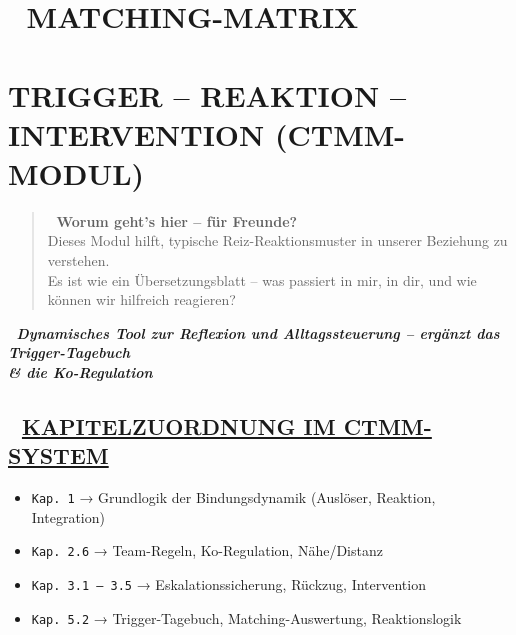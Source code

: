 \hypertarget{matching-matrix}{%
\section{\texorpdfstring{🧩 \textbf{MATCHING-MATRIX}}{🧩 MATCHING-MATRIX}}\label{matching-matrix}}

\hypertarget{trigger-reaktion-intervention-ctmm-modul}{%
\section{\texorpdfstring{\textbf{TRIGGER -- REAKTION -- INTERVENTION (CTMM-MODUL)}}{TRIGGER -- REAKTION -- INTERVENTION (CTMM-MODUL)}}\label{trigger-reaktion-intervention-ctmm-modul}}

\begin{quote}
🧠 \textbf{Worum geht's hier -- für Freunde?}\\
Dieses Modul hilft, typische Reiz-Reaktionsmuster in unserer Beziehung zu verstehen.\\
Es ist wie ein Übersetzungsblatt -- was passiert in mir, in dir, und wie können wir hilfreich reagieren?
\end{quote}

🧩 \emph{\textbf{Dynamisches Tool zur Reflexion und Alltagssteuerung -- ergänzt das Trigger-Tagebuch \\\& die Ko-Regulation}}

\hypertarget{section}{%
\subsection{}\label{section}}

\hypertarget{kapitelzuordnung-im-ctmm-system}{%
\subsection{\texorpdfstring{📘 \textbf{\ul{KAPITELZUORDNUNG IM CTMM-SYSTEM}}}{📘 KAPITELZUORDNUNG IM CTMM-SYSTEM}}\label{kapitelzuordnung-im-ctmm-system}}

\begin{itemize}
\tightlist
\item
  \texttt{Kap.\ 1} → Grundlogik der Bindungsdynamik (Auslöser, Reaktion, Integration)
\item
  \texttt{Kap.\ 2.6} → Team-Regeln, Ko-Regulation, Nähe/Distanz
\item
  \texttt{Kap.\ 3.1 -- 3.5} → Eskalationssicherung, Rückzug, Intervention
\item
  \texttt{Kap.\ 5.2} → Trigger-Tagebuch, Matching-Auswertung, Reaktionslogik
\end{itemize}

